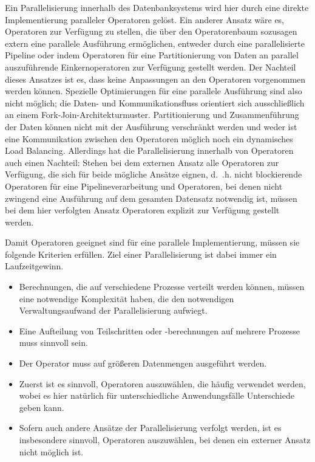 \documentclass[a4paper,12pt,twoside]{article}
\begin{document}
Ein Parallelisierung innerhalb des Datenbanksystems wird hier durch eine direkte Implementierung paralleler Operatoren gelöst. Ein anderer Ansatz wäre es, Operatoren zur Verfügung zu stellen, die über den Operatorenbaum sozusagen extern eine parallele Ausführung ermöglichen, entweder durch eine parallelisierte Pipeline oder indem Operatoren für eine Partitionierung von Daten an parallel auszuführende Einkernoperatoren zur Verfügung gestellt werden. Der Nachteil dieses Ansatzes ist es, dass keine Anpassungen an den Operatoren vorgenommen werden können. Spezielle Optimierungen für eine parallele Ausführung sind also nicht möglich; die Daten- und Kommunikationsfluss orientiert sich ausschließlich an einem Fork-Join-Architekturmuster. Partitionierung und Zusammenführung der Daten können nicht mit der Ausführung verschränkt werden und weder ist eine Kommunikation zwischen den Operatoren möglich noch ein dynamisches Load Balancing. Allerdings hat die Parallelisierung innerhalb von Operatoren auch einen Nachteil: Stehen bei dem externen Ansatz alle Operatoren zur Verfügung, die sich für beide mögliche Ansätze eignen, d.~.h. nicht blockierende Operatoren für eine Pipelineverarbeitung und Operatoren, bei denen nicht zwingend eine Ausführung auf dem gesamten Datensatz notwendig ist, müssen bei dem hier verfolgten Ansatz Operatoren explizit zur Verfügung gestellt werden.  

Damit Operatoren geeignet sind für eine parallele Implementierung, müssen sie folgende Kriterien erfüllen. Ziel einer Parallelisierung ist dabei immer ein Laufzeitgewinn.

\begin{itemize}
	\item Berechnungen, die auf verschiedene Prozesse verteilt werden können, müssen eine notwendige Komplexität haben, die den notwendigen Verwaltungsaufwand der Parallelisierung aufwiegt.
	\item Eine Aufteilung von Teilschritten oder -berechnungen auf mehrere Prozesse muss sinnvoll sein.
	\item Der Operator muss auf größeren Datenmengen ausgeführt werden.
	\item Zuerst ist es sinnvoll, Operatoren auszuwählen, die häufig verwendet werden, wobei es hier natürlich für unterschiedliche Anwendungsfälle Unterschiede geben kann.
	\item Sofern auch andere Ansätze der Parallelisierung verfolgt werden, ist es insbesondere sinnvoll, Operatoren auszuwählen, bei denen ein externer Ansatz nicht möglich ist.
\end{itemize}
\end{document}
